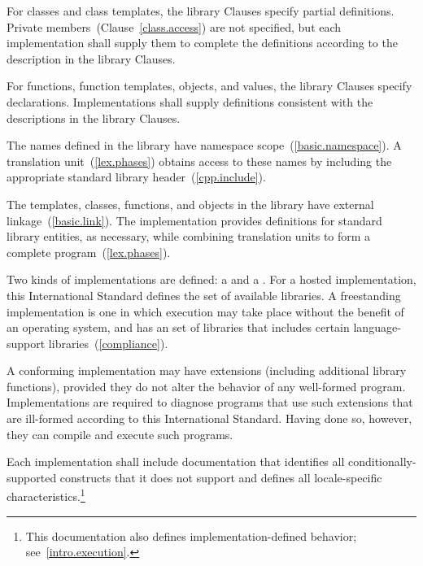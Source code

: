 \pnum
{}%
%
%
For classes and class templates, the library Clauses specify partial
definitions. Private members~(Clause~\ref{class.access}) are not
specified, but each implementation shall supply them to complete the
definitions according to the description in the library Clauses.

\pnum
For functions, function templates, objects, and values, the library
Clauses specify declarations. Implementations shall supply definitions
consistent with the descriptions in the library Clauses.

\pnum
The names defined in the library have namespace
scope~(\ref{basic.namespace}). A \Cpp  translation
unit~(\ref{lex.phases}) obtains access to these names by including the
appropriate standard library header~(\ref{cpp.include}).

\pnum
The templates, classes, functions, and objects in the library have
external linkage~(\ref{basic.link}). The implementation provides
definitions for standard library entities, as necessary, while combining
translation units to form a complete \Cpp  program~(\ref{lex.phases}).%

\pnum
Two kinds of implementations are defined: a  and a
. For a hosted implementation, this
International Standard defines the set of available libraries. A freestanding
implementation is one in which execution may take place without the benefit of
an operating system, and has an  set of libraries that includes certain language-support
libraries~(\ref{compliance}).

\pnum
A conforming implementation may have extensions (including
additional library functions), provided they do not alter the
behavior of any well-formed program.
Implementations are required to diagnose programs that use such
extensions that are ill-formed according to this International Standard.
Having done so, however, they can compile and execute such programs.

\pnum
Each implementation shall include documentation that identifies all
conditionally-supported constructs
that it does not support and defines all locale-specific characteristics.\footnote{This documentation also defines implementation-defined behavior;
see~\ref{intro.execution}.}%
%
%

